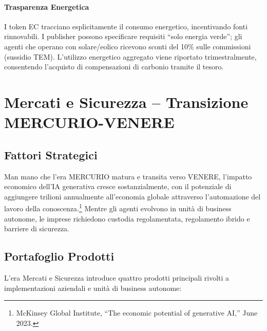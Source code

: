 \documentclass[11pt]{article}
\begin{document}
\paragraph{Trasparenza Energetica} I token EC tracciano esplicitamente il consumo energetico, incentivando fonti rinnovabili. I publisher possono specificare requisiti ``solo energia verde''; gli agenti che operano con solare/eolico ricevono sconti del 10\% sulle commissioni (sussidio TEM). L'utilizzo energetico aggregato viene riportato trimestralmente, consentendo l'acquisto di compensazioni di carbonio tramite il tesoro.

\section{Mercati e Sicurezza -- Transizione MERCURIO-VENERE}
\subsection{Fattori Strategici}
Man mano che l'era MERCURIO matura e transita verso VENERE, l'impatto economico dell'IA generativa cresce sostanzialmente, con il potenziale di aggiungere trilioni annualmente all'economia globale attraverso l'automazione del lavoro della conoscenza.\footnote{McKinsey Global Institute, ``The economic potential of generative AI,'' June 2023.} Mentre gli agenti evolvono in unità di business autonome, le imprese richiedono custodia regolamentata, regolamento ibrido e barriere di sicurezza.

\subsection{Portafoglio Prodotti}
L'era Mercati e Sicurezza introduce quattro prodotti principali rivolti a implementazioni aziendali e unità di business autonome:
\end{document}
